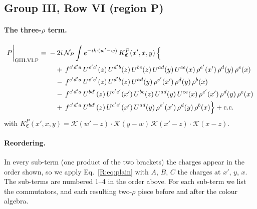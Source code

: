 \documentclass[10pt]{article}
\numberwithin{equation}{section}
\newcommand{\KK}{\mathcal K}
\newcommand{\NP}{\mathcal N_{P}}
\begin{document}
\subsection{Group III, Row VI (region P)}\label{B:sec:GIII.VI.P}

\paragraph{The three-$\rho$ term.}
\begin{align}
P\bigg|_{\rm GIII.VI.P}={}&-2i\,\NP\int e^{-ik\cdot(w'-w)}\,K^{P}_{\mathfrak C}(x',x,y)\,\Big\{\notag\\
&\quad +\,f^{c'd'a}\,U^{e'c'}(z)\,U^{d'b}(z)\,U^{bc}(z)\,U^{ad}(y)\,U^{ce}(x)\,\rho^{e'}(x')\,\rho^{d}(y)\,\rho^{e}(x)\notag\\
&\quad -\,f^{c'd'a}\,U^{e'c'}(z)\,U^{d'b}(z)\,U^{ad}(y)\,\rho^{e'}(x')\,\rho^{d}(y)\,\rho^{b}(x)\notag\\
&\quad -\,f^{c'd'a}\,U^{bd'}(z)\,U^{c'e'}(x')\,U^{bc}(z)\,U^{ad}(y)\,U^{ce}(x)\,\rho^{e'}(x')\,\rho^{d}(y)\,\rho^{e}(x)\notag\\
&\quad +\,f^{c'd'a}\,U^{bd'}(z)\,U^{c'e'}(x')\,U^{ad}(y)\,\rho^{e'}(x')\,\rho^{d}(y)\,\rho^{b}(x)\Big\}+{\rm c.c.}\label{B:eq:in-GIII.VI.P}
\end{align}
with $K^{P}_{\mathfrak C}(x',x,y)=\KK(w'-z)\cdot\KK(y-w)\,\KK(x'-z)\cdot\KK(x-z)$.
\paragraph{Reordering.} In every sub-term (one product of the two brackets) the charges appear in the order shown, so we apply Eq.~\eqref{R:eq:plain} with $A$, $B$, $C$ the charges at $x'$, $y$, $x$. The sub-terms are numbered 1--4 in the order above. For each sub-term we list the commutators, and each resulting two-$\rho$ piece before and after the colour algebra.
\end{document}
